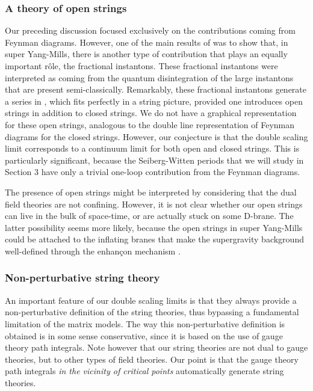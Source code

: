 \documentclass[a4paper,12pt]{article}
\begin{document}
{\subsubsection{A theory of open strings}
%
Our preceding discussion focused exclusively on the contributions coming from 
Feynman diagrams. However, one of the main results
of \cite{fer} was to show that, 
in \coordHE{} super Yang-Mills, there is another type of contribution 
that plays an equally important r\^ole, the fractional instantons. These 
fractional instantons were interpreted as coming from the quantum
disintegration of the large instantons that are present semi-classically.
Remarkably, these fractional instantons generate a series in \coordHE{}, which 
fits perfectly in a string picture, provided one introduces open strings in 
addition to closed strings. We do not have a graphical representation for 
these open strings, analogous to the double line representation of
Feynman diagrams for the closed strings. However, our conjecture is that 
the double scaling limit corresponds to a continuum limit for both open and 
closed strings. This is particularly significant, because the 
Seiberg-Witten periods that we will study in Section 3
have only a trivial one-loop contribution from the Feynman diagrams.

The presence of open strings might be interpreted by considering that the 
dual field theories are not confining. However, it is not clear whether our 
open strings can live in the bulk of space-time, or are actually stuck 
on some D-brane. The latter possibility seems more likely, because the 
open strings in \coordHE{} super Yang-Mills \cite{fer} could be
attached to the inflating branes that make the supergravity 
background well-defined through the enhan\c con mechanism \cite{pol}.
%
\subsubsection{Non-perturbative string theory}
%
An important feature of our double scaling limits is that they always 
provide a non-perturbative definition of the string theories, thus 
bypassing a fundamental limitation of the \coordHE{} matrix models. The way 
this non-perturbative definition is obtained is in some sense 
conservative, since it is based on the use of gauge theory path integrals. 
Note however that our string theories are not dual to gauge theories, but 
to other types of field theories. Our point is that
the gauge theory path integrals {\it in the vicinity of critical points}
automatically generate string theories.

}
\end{document}
